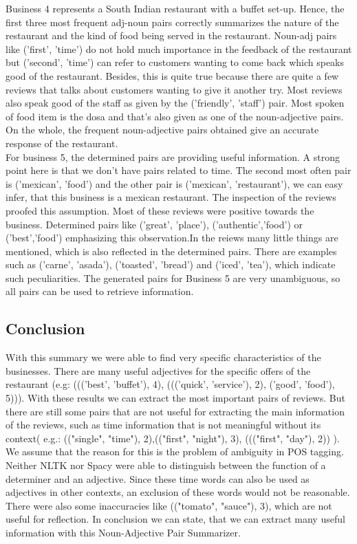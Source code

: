 Business 4 represents a South Indian restaurant with a buffet set-up. Hence, the first three most frequent adj-noun pairs correctly summarizes the nature of the restaurant and the kind of food being served in the restaurant. Noun-adj pairs like ('first’, 'time’) do not hold much importance in the feedback of the restaurant but ('second’, 'time’) can refer to customers wanting to come back which speaks good of the restaurant. Besides, this is quite true because there are quite a few reviews that talks about customers wanting to give it another try. Most reviews also speak good of the staff as given by the ('friendly’, 'staff’) pair. Most spoken of food item is the dosa and that’s also given as one of the noun-adjective pairs. On the whole, the frequent noun-adjective pairs obtained give an accurate response of the restaurant.\\
For business 5, the determined pairs are providing useful information. A strong point here is that we don't have pairs related to time. The second most often pair is ('mexican', 'food') and the other pair is ('mexican', 'restaurant'), we can easy infer, that this business is a mexican restaurant. The inspection of the reviews proofed this assumption. Most of these reviews were positive towards the business. Determined pairs like ('great', 'place'), ('authentic','food') or ('best','food') emphasizing this observation.In the reiews many little things are mentioned, which is also reflected in the determined pairs. There are examples such as ('carne', 'asada'), ('toasted', 'bread') and ('iced', 'tea'), which indicate such peculiarities. The generated pairs for Business 5 are very unambiguous, so all pairs can be used to retrieve information.
	

	
\subsection{Conclusion}
With this summary we were able to find very specific characteristics of the businesses. There are many useful adjectives for the specific offers of the restaurant (e.g: ((('best', 'buffet'), 4), ((('quick', 'service'), 2), ('good', 'food'), 5))). With these results we can extract the most important pairs of reviews. But there are still some pairs that are not useful for extracting the main information of the reviews, such as time information that is not meaningful without its context( e.g.: (("single", "time"), 2),(("first", "night"), 3), ((("first", "day"), 2)) ). We assume that the reason for this is the problem of ambiguity in POS tagging. Neither NLTK nor Spacy were able to distinguish between the function of a determiner and an adjective. Since these time words can also be used as adjectives in other contexts, an exclusion of these words would not be reasonable. There were also some inaccuracies like (("tomato", "sauce"), 3), which are not useful for reflection.
In conclusion we can state, that we can extract many useful information with this Noun-Adjective Pair Summarizer.